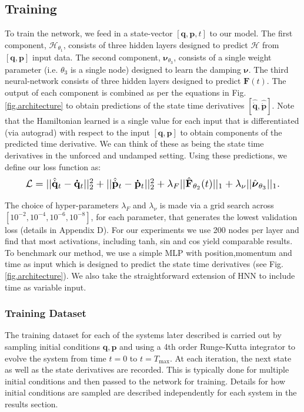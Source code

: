\documentclass{article}
\begin{document}
\subsection{Training}
To train the network, we feed in a state-vector $ [\mathbf{q},\mathbf{p},t]$ to our model. The first component, $\mathcal{H}_{\theta_1}$, consists of three hidden layers designed to predict $\mathcal{H}$ from $[\mathbf{q},\mathbf{p}]$ input data. The second component, $\boldsymbol\nu_{\theta_3}$, consists of a single weight parameter (i.e. $\theta_3$ is a single node) designed to learn the damping $\boldsymbol\nu$. The third neural-network consists of three hidden layers designed to predict $\mathbf{F}(t)$. The output of each component is combined as per the equations in Fig.\ref{fig.architecture} to obtain predictions of the state time derivatives $[\hat{\dot{\mathbf{q}}},\hat{\dot{\mathbf{p}}}]$. Note that the Hamiltonian learned is a single value for each input that is differentiated (via autograd) with respect to the input $[\mathbf{q},\mathbf{p}]$ to obtain components of the predicted time derivative. We can think of these as being the state time derivatives in the unforced and undamped setting. Using these predictions, we define our loss function as:
\begin{equation}
\label{eqn.loss}
\resizebox{0.9\columnwidth}{!}{%
  $\mathcal{L} =|| \hat{\dot{\mathbf{q}}}_t - \mathbf{\dot{q}}_t ||_2^2 +
|| \hat{\dot{\mathbf{p}}}_t -\mathbf{\dot{p}}_t ||_2^2 + \lambda_F|| \hat{\mathbf{F}}_{\theta_2} (t)||_1 + \lambda_\nu||\hat{\boldsymbol\nu}_{\theta_3}||_1$.%
}
\end{equation}

The choice of hyper-parameters $\lambda_F$ and $\lambda_{\nu}$ is made via a grid search across $[10^{-2},10^{-4},10^{-6},10^{-8}]$, for each parameter, that generates the lowest validation loss (details in Appendix D). For our experiments we use 200 nodes per layer and find that most activations, including tanh, sin and cos yield comparable results. To benchmark our method, we use a simple MLP with position,momentum and time as input which is designed to predict the state time derivatives (see Fig.\ref{fig.architecture}). We also take the straightforward extension of HNN to include time as variable input. 
\subsubsection{Training Dataset}

The training dataset for each of the systems later described is carried out by sampling initial conditions $\mathbf{q},\mathbf{p}$ and using a 4th order Runge-Kutta integrator to evolve the system from time $t=0$ to $t=T_{\max}$. At each iteration, the next state as well as the state derivatives are recorded. This is typically done for multiple initial conditions and then passed to the network for training. Details for how initial conditions are sampled are described independently for each system in the results section.
\end{document}
